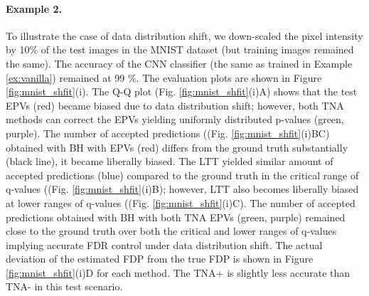 \documentclass{article}
\begin{document}
	
\paragraph{Example 2.} To illustrate the case of data distribution shift, we down-scaled the pixel intensity by 10\% of the test images in the MNIST dataset (but training images remained the same). The accuracy of the CNN classifier (the same as trained in Example \ref{ex:vanilla}) remained at 99 \%. The evaluation plots are shown in Figure \ref{fig:mnist_shfit}(i). The Q-Q plot (Fig. \ref{fig:mnist_shfit}(i)A) shows that the test EPVs (red) became biased due to data distribution shift; however, both TNA methods can correct the EPVs yielding uniformly distributed p-values (green, purple). The number of accepted predictions ((Fig. \ref{fig:mnist_shfit}(i)BC) obtained with BH with EPVs (red) differs from the ground truth substantially (black line), it became liberally biased. The LTT yielded similar amount of accepted predictions (blue) compared to the ground truth in the critical range of q-values ((Fig. \ref{fig:mnist_shfit}(i)B); however, LTT also becomes liberally biased at lower ranges of q-values ((Fig. \ref{fig:mnist_shfit}(i)C). The number of accepted predictions obtained with BH with both TNA EPVs (green, purple) remained close to the ground truth over both the critical and lower ranges of q-values implying accurate FDR control under data distribution shift. The actual deviation of the estimated FDP from the true FDP is shown in Figure \ref{fig:mnist_shfit}(i)D for each method. The TNA+ is slightly less accurate than TNA- in this test scenario.
\end{document}
